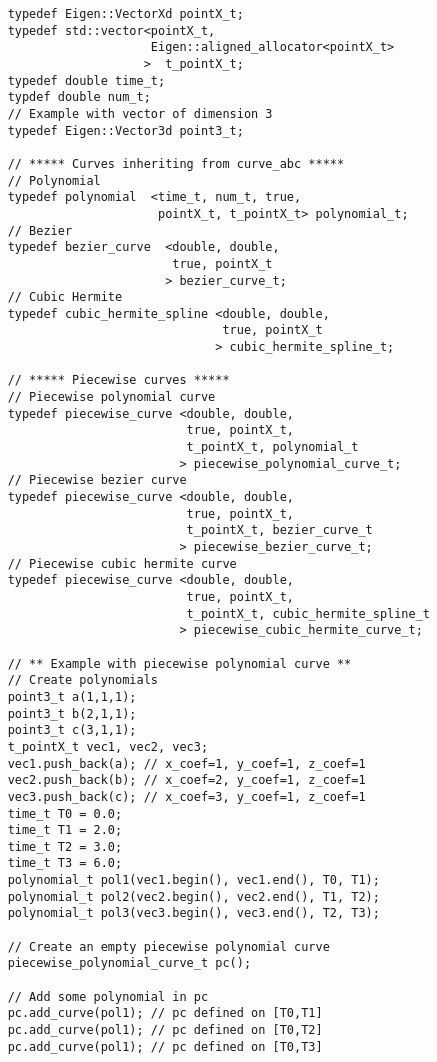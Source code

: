 \documentclass{article}
\begin{document}
    \begin{lstlisting}
    typedef Eigen::VectorXd pointX_t;
    typedef std::vector<pointX_t,
                        Eigen::aligned_allocator<pointX_t>
                       >  t_pointX_t;
    typedef double time_t;
    typdef double num_t;
    // Example with vector of dimension 3
    typedef Eigen::Vector3d point3_t;

    // ***** Curves inheriting from curve_abc *****
    // Polynomial
    typedef polynomial  <time_t, num_t, true,
                         pointX_t, t_pointX_t> polynomial_t;
    // Bezier
    typedef bezier_curve  <double, double,
                           true, pointX_t
                          > bezier_curve_t;
    // Cubic Hermite
    typedef cubic_hermite_spline <double, double,
                                  true, pointX_t
                                 > cubic_hermite_spline_t;

    // ***** Piecewise curves *****
    // Piecewise polynomial curve
    typedef piecewise_curve <double, double,
                             true, pointX_t,
                             t_pointX_t, polynomial_t
                            > piecewise_polynomial_curve_t;
    // Piecewise bezier curve
    typedef piecewise_curve <double, double,
                             true, pointX_t,
                             t_pointX_t, bezier_curve_t
                            > piecewise_bezier_curve_t;
    // Piecewise cubic hermite curve
    typedef piecewise_curve <double, double,
                             true, pointX_t,
                             t_pointX_t, cubic_hermite_spline_t
                            > piecewise_cubic_hermite_curve_t;

    // ** Example with piecewise polynomial curve **
    // Create polynomials
    point3_t a(1,1,1);
    point3_t b(2,1,1);
    point3_t c(3,1,1);
    t_pointX_t vec1, vec2, vec3;
    vec1.push_back(a); // x_coef=1, y_coef=1, z_coef=1
    vec2.push_back(b); // x_coef=2, y_coef=1, z_coef=1
    vec3.push_back(c); // x_coef=3, y_coef=1, z_coef=1
    time_t T0 = 0.0;
    time_t T1 = 2.0;
    time_t T2 = 3.0;
    time_t T3 = 6.0;
    polynomial_t pol1(vec1.begin(), vec1.end(), T0, T1);
    polynomial_t pol2(vec2.begin(), vec2.end(), T1, T2);
    polynomial_t pol3(vec3.begin(), vec3.end(), T2, T3);

    // Create an empty piecewise polynomial curve
    piecewise_polynomial_curve_t pc();

    // Add some polynomial in pc
    pc.add_curve(pol1); // pc defined on [T0,T1]
    pc.add_curve(pol1); // pc defined on [T0,T2]
    pc.add_curve(pol1); // pc defined on [T0,T3]


\end{lstlisting}
\end{document}
